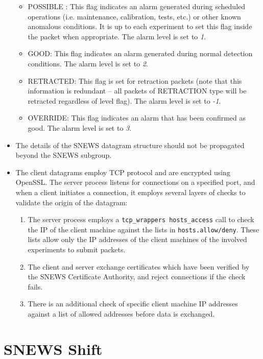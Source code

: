 \documentclass{article}
\begin{document}
\begin{itemize}
\begin{itemize}
\item POSSIBLE : This flag indicates an alarm
generated during scheduled operations (i.e. maintenance, calibration,
tests, etc.) or other known anomalous conditions. It is up to each
experiment to set this flag inside the packet when appropriate.  The
alarm level is set to {\it 1}.

\item GOOD: This flag indicates an alarm generated during
normal detection conditions.  The alarm level is set to {\it 2}.

\item RETRACTED: This flag is set for retraction 
packets (note that this information is redundant -- all packets of
RETRACTION type will be retracted regardless of level flag).  The
alarm level is set to {\it -1}.

\item OVERRIDE: This flag indicates an alarm 
that has been confirmed as good.  The alarm level is set to {\it 3}.

\end{itemize}
 
\item The details of the SNEWS datagram structure should
not be propagated beyond the SNEWS subgroup.

\item The client datagrams employ TCP protocol and 
are encrypted using OpenSSL.  
The server process listens for connections on a specified port,
and when a client initiates a connection, it employs several layers
of checks to validate the origin of the datagram:
\begin{enumerate}
\item The server process employs a {\tt tcp\_wrappers hosts\_access}
call to check the IP of the client machine against the lists in
{\tt hosts.allow/deny}.  These lists allow only the IP addresses
of the client machines of the involved experiments to submit packets.
\item
The client and server exchange certificates which have been
verified by the SNEWS Certificate Authority, and reject
connections if the check fails.
\item There is an additional check of specific client machine
IP addresses against a list of allowed addresses before data is exchanged.
\end{enumerate}
\end{itemize}

\section{SNEWS Shift}
\end{document}
